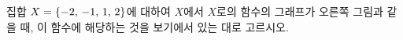 \noindent\begin{minipage}[t]{0.58\linewidth}\vspace{0pt}\raggedright 집합 $X=\{-2,\mkern3mu -1,\mkern3mu 1,\mkern3mu 2\}$에 대하여 $X$에서 $X$로의 함수의 그래프가 오른쪽 그림과 같을 때, 이 함수에 해당하는 것을 보기에서 있는 대로 고르시오.\end{minipage}\hfill\begin{minipage}[t]{0.4\linewidth}\vspace{0pt}\centering \resizebox{\ifdim\width>\linewidth\linewidth\else\width\fi}{!}{}\end{minipage}\par
\noindent {}
